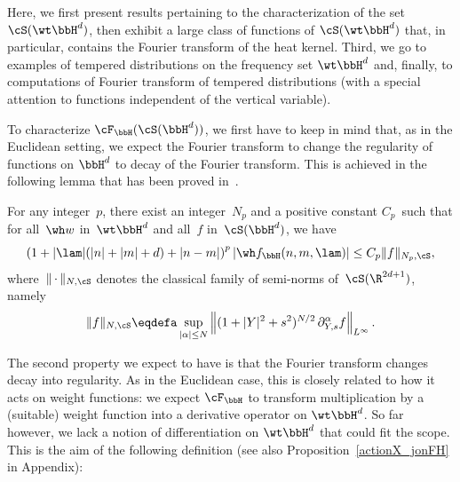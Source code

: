 Here, we first present results pertaining to the characterization of the set $\cS(\wt\bbH^d)$, then exhibit a large class of functions of $\cS(\wt\bbH^d)$ that, in particular, contains the Fourier transform of the heat kernel. Third, we go to examples of tempered distributions on the frequency set $\wt\bbH^d$ and, finally, to computations of Fourier transform of tempered distributions (with a special attention to functions independent of the vertical variable).

To characterize $\cF_\bbH(\cS(\bbH^d))$, we first have to keep in mind that, as in the Euclidean setting, we expect the Fourier transform to change the regularity of functions on $\bbH^d$ to decay of the Fourier transform. This is achieved in the following lemma that has been proved in~\cite{bcdFHspace}.

\begin{lemm}\label{decaylambdan}
For any integer~$p$, there exist an integer~$N_p$ and a positive constant $C_p$~such that for all~$\wh w$ in~$\wt \bbH^d$ and all~$f$ in~$\cS(\bbH^d)$, we have
\begin{equation}\label{eq:decay}
\left(1+ |\lam|(|n| + |m|+ d) +|n-m| \right)^p |\wh f_\bbH(n,m,\lam)| \leq C_p \|f\|_{N_p,\cS},
\end{equation}
where~$\|{\,\cdot\,}\|_{N,\cS}$ denotes the classical family of semi-norms of~$\cS(\R^{2d+1})$, namely
\[
\|f\|_{N,\cS}\eqdefa \sup_{ |\alpha|\leq N} \left\|(1+|Y|^2+s^2)^{N/2}\,\partial_{Y,s}^\alpha f \right\|_{L^\infty}.
\]
\end{lemm}

The second property we expect to have is that the Fourier transform changes decay into regularity. As in the Euclidean case, this is closely related to how it acts on weight functions: we expect $\cF_\bbH$ to transform multiplication by a (suitable) weight function into a derivative operator on $\wt\bbH^d$. So far however, we lack a notion of differentiation on $\wt\bbH^d$ that could fit the scope. This is the aim of the following definition (see also Proposition~\ref{actionX_jonFH} in Appendix):

